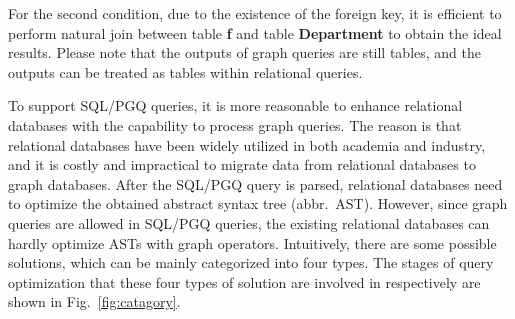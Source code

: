 {\begin{example}
    For the second condition, due to the existence of the foreign key, it is efficient to perform natural join between table \textbf{f} and table \textbf{Department} to obtain the ideal results.
    Please note that the outputs of graph queries are still tables, and the outputs can be treated as tables within relational queries.
\end{example}

To support SQL/PGQ queries, it is more reasonable to enhance relational databases with the capability to process graph queries.
The reason is that relational databases have been widely utilized in both academia and industry, and it is costly and impractical to migrate data from relational databases to graph databases.
After the SQL/PGQ query is parsed, relational databases need to optimize the obtained abstract syntax tree (abbr.~AST).
However, since graph queries are allowed in SQL/PGQ queries, the existing relational databases can hardly optimize ASTs with graph operators.
Intuitively, there are some possible solutions, which can be mainly categorized into four types.
The stages of query optimization that these four types of solution are involved in respectively are shown in Fig.~\ref{fig:catagory}.

}
